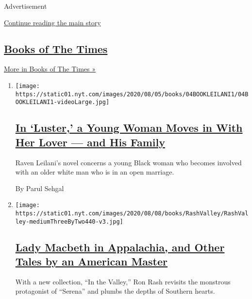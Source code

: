 Advertisement

\protect\hyperlink{after-mid1}{Continue reading the main story}

\hypertarget{books-of-the-times}{%
\subsection{\texorpdfstring{\href{/column/books-of-the-times}{Books of
The Times}}{Books of The Times}}\label{books-of-the-times}}

\href{/column/books-of-the-times}{More in Books of The Times »}

\begin{enumerate}
\def\labelenumi{\arabic{enumi}.}
\item
  \texttt{[image: https://static01.nyt.com/images/2020/08/05/books/04BOOKLEILANI1/04BOOKLEILANI1-videoLarge.jpg]}

  \hypertarget{in-luster-a-young-woman-moves-in-with-her-lover--and-his-family}{%
  \subsection{\texorpdfstring{\href{/2020/08/04/books/review-luster-raven-leilani.html}{In
  `Luster,' a Young Woman Moves in With Her Lover --- and His
  Family}}{In `Luster,' a Young Woman Moves in With Her Lover --- and His Family}}\label{in-luster-a-young-woman-moves-in-with-her-lover--and-his-family}}

  Raven Leilani's novel concerns a young Black woman who becomes
  involved with an older white man who is in an open marriage.

  By Parul Sehgal
\item
  \texttt{[image: https://static01.nyt.com/images/2020/08/08/books/RashValley/RashValley-mediumThreeByTwo440-v3.jpg]}

  \hypertarget{lady-macbeth-in-appalachia-and-other-tales-by-an-american-master}{%
  \subsection{\texorpdfstring{\href{/2020/08/02/books/ron-rash-in-valley-serena.html}{Lady
  Macbeth in Appalachia, and Other Tales by an American
  Master}}{Lady Macbeth in Appalachia, and Other Tales by an American Master}}\label{lady-macbeth-in-appalachia-and-other-tales-by-an-american-master}}

  With a new collection, ``In the Valley,'' Ron Rash revisits the
  monstrous protagonist of ``Serena'' and plumbs the depths of Southern
  hearts.


\end{enumerate}
